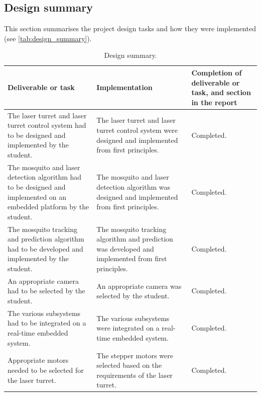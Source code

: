 \subsection{Design summary}

This section summarises the project design tasks and how they were
implemented (see \autoref{tab:design_summary}).
\begin{table}[H]
    \centering
    \begin{tabularx}{\textwidth}{|X|X|X|}
        \hline
        \textbf{Deliverable or task}                                                                                          & \textbf{Implementation}                                                                               &
        \textbf{Completion of deliverable or task, and section in the report}
        \\
        \hline
        The laser turret and laser turret control system had to be designed and implemented by the student.                   & The laser turret and laser turret control system were designed and implemented from first principles. & Completed.
        \\
        \hline
        The mosquito and laser detection algorithm had to be designed and implemented on an embedded platform by the student. & The mosquito and laser detection algorithm was designed and implemented from first principles.        & Completed.
        \\
        \hline
        The mosquito tracking and prediction algorithm had to be developed and implemented by the student.                    & The mosquito tracking algorithm and prediction was developed and implemented from first principles.   & Completed.
        \\
        \hline
        An appropriate camera had to be selected by the student.                                                              & An appropriate camera was selected by the student.                                                    & Completed.
        \\
        \hline
        \hline
        The various subsystems had to be integrated on a real-time embedded system.                                           &
        The various subsystems were integrated on a real-time embedded system.                                                &
        Completed.
        \\
        \hline
        Appropriate motors needed to be selected for the laser turret.                                                        &
        The stepper motors were selected based on the requirements of the laser turret.                                       &
        Completed.
        \\
        \hline
    \end{tabularx}
    \caption{Design summary.}
    \label{tab:design_summary}
\end{table}


